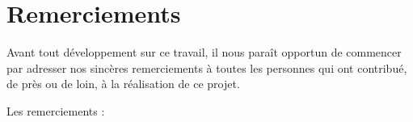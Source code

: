 \documentclass[12pt, a4paper, oneside]{report}
\begin{document}
\chapter*{Remerciements}

Avant tout développement sur ce travail, il nous paraît opportun de commencer par adresser nos sincères remerciements à toutes les personnes qui ont contribué, de près ou de loin, à la réalisation de ce projet.

Les remerciements  :


\newpage



\tableofcontents
\newpage

\listoffigures
{}
\newpage

\listoftables
{}
\newpage

\listofalgorithms
{}
\newpage

\printglossary[type=\acronymtype, title={Liste des abréviations}, toctitle={Liste des abréviations}]
\newpage
\end{document}
